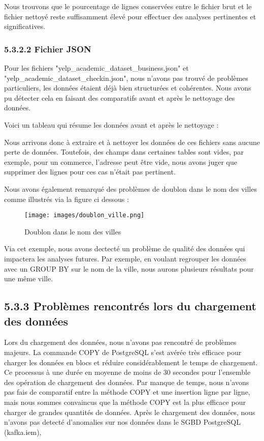 \begin{itemize}
Nous trouvons que le pourcentage de lignes conservées entre le fichier brut et le fichier nettoyé reste suffisamment élevé pour effectuer des analyses pertinentes et significatives.


\subsubsection{5.3.2.2 Fichier JSON}

Pour les fichiers "yelp_academic_dataset_business.json" et "yelp_academic_dataset_checkin.json", nous n'avons pas trouvé de problèmes particuliers, les données étaient déjà bien structurées et cohérentes.
Nous avons pu détecter cela en faisant des comparatifs avant et après le nettoyage des données.

Voici un tableau qui résume les données avant et après le nettoyage :

Nous arrivons donc à extraire et à nettoyer les données de ces fichiers sans aucune perte de données. Toutefois, des champs dans certaines tables sont vides, par exemple, pour un commerce,
l'adresse peut être vide, nous avons juger que supprimer des lignes pour ces cas n'était pas pertinent.

Nous avons également remarqué des problèmes de doublon dans le nom des villes comme illustrés via la figure ci dessous :

\begin{figure}[h]
\centering
\texttt{[image: images/doublon\_ville.png]}
\caption{Doublon dans le nom des villes}
\end{figure}

Via cet exemple, nous avons dectecté un problème de qualité des données qui impactera les analyses futures. Par exemple, en voulant regrouper les données avec un GROUP BY sur le nom de la ville, nous aurons plusieurs résultats pour une même ville.


\subsection{5.3.3 Problèmes rencontrés lors du chargement des données}

Lors du chargement des données, nous n'avons pas rencontré de problèmes majeurs.
La commande COPY de PostgreSQL s'est avérée très efficace pour charger les données en blocs et réduire considérablement le temps de chargement.
Ce processus à une durée en moyenne de moins de 30 secondes pour l'ensemble des opération de chargement des données.
Par manque de temps, nous n'avons pas fais de comparatif entre la méthode COPY et une insertion ligne par ligne, mais nous sommes convaincus que la méthode COPY est la plus efficace pour charger de grandes quantités de données.
Après le chargement des données, nous n'avons pas detecté d'anomalies sur nos données dans le SGBD PostgreSQL (kafka.iem),



\end{itemize}
